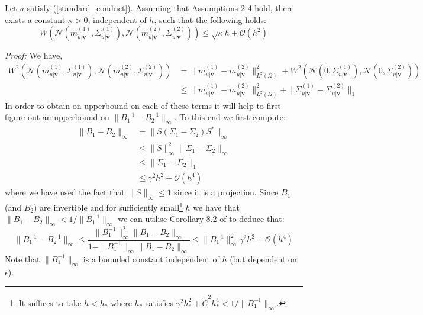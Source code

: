 \begin{theorem}
    \label{posterior_difference_bound}
    Let $u$ satisfy (\ref{standard_conduct}). Assuming that Assumptions 2-4 hold, there exists a constant $\kappa>0$, independent of $h$, such that the following holds:
    \begin{equation}
        \label{post_bound}
        W\left(\mathcal{N}(m^{(1)}_{u|\mathbf{v}},\Sigma^{(1)}_{u|\mathbf{v}}),\mathcal{N}(m^{(2)}_{u|\mathbf{v}},\Sigma^{(2)}_{u|\mathbf{v}})\right)\leq\sqrt{\kappa} h + \mathcal{O}(h^2)
    \end{equation}
\end{theorem}

\noindent \textit{Proof:} We have,
\begin{align*}
    W^{2}\left(\mathcal{N}(m^{(1)}_{u|\mathbf{v}},\Sigma^{(1)}_{u|\mathbf{v}}),\mathcal{N}(m^{(2)}_{u|\mathbf{v}},\Sigma^{(2)}_{u|\mathbf{v}})\right)&=\|m^{(1)}_{u|\mathbf{v}}-m^{(2)}_{u|\mathbf{v}}\|_{L^{2}(\Omega)}^{2}+W^{2}\left(\mathcal{N}(0,\Sigma^{(1)}_{u|\mathbf{v}}),\mathcal{N}(0,\Sigma^{(2)}_{u|\mathbf{v}})\right) \\
    &\leq \|m^{(1)}_{u|\mathbf{v}}-m^{(2)}_{u|\mathbf{v}}\|_{L^{2}(\Omega)}^{2} + \|\Sigma^{(1)}_{u|\mathbf{v}}-\Sigma^{(2)}_{u|\mathbf{v}}\|_{1}
\end{align*}
In order to obtain on upperbound on each of these terms it will help to first figure out an upperbound on $\|B_{1}^{-1}-B_{2}^{-1}\|_{\infty}$. To this end we first compute:
\begin{align*}
    \|B_{1}-B_{2}\|_{\infty}&=\|S(\Sigma_{1}-\Sigma_{2})S^{*}\|_{\infty} \\
    &\leq\|S\|_{\infty}^{2}\|\Sigma_{1}-\Sigma_{2}\|_{\infty} \\
    &\leq\|\Sigma_{1}-\Sigma_{2}\|_{1} \\
    &\leq \gamma^{2}h^{2}+\mathcal{O}(h^4)
\end{align*}
where we have used the fact that $\|S\|_{\infty}\leq 1$ since it is a projection. Since $B_{1}$ (and $B_{2}$) are invertible and for sufficiently small\footnote{It suffices to take $h<h_{*}$ where $h_{*}$ satisfies $\gamma^{2}h_{*}^{2}+\tilde{C}^{2}h_{*}^{4}<1/\|B_{1}^{-1}\|_{\infty}$.} $h$ we have that $\|B_{1}-B_{2}\|_{\infty}<1/\|B_{1}^{-1}\|_{\infty}$ we can utilise Corollary 8.2 of \textcolor{blue}{\citep{gohberg2012basic}} to deduce that:
\begin{equation}
    \label{bound_on_diff_inverses}
    \|B_{1}^{-1}-B_{2}^{-1}\|_{\infty}\leq\frac{\|B_{1}^{-1}\|_{\infty}^{2}\|B_{1}-B_{2}\|_{\infty}}{1-\|B_{1}^{-1}\|_{\infty}\|B_1-B_{2}\|_{\infty}}\leq\|B_{1}^{-1}\|_{\infty}^{2}\gamma^{2}h^{2}+\mathcal{O}(h^4)
\end{equation}
Note that $\|B_{1}^{-1}\|_{\infty}$ is a bounded constant independent of $h$ (but dependent on $\epsilon$).

